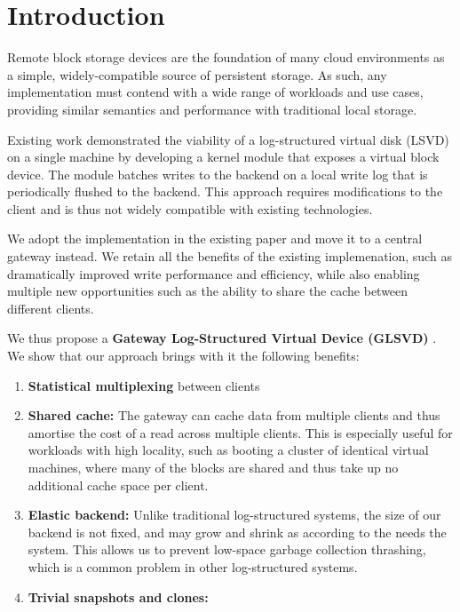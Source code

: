 \section{Introduction}

Remote block storage devices are the foundation of many cloud environments as
a simple, widely-compatible source of persistent storage. As such, any
implementation must contend with a wide range of workloads and use cases,
providing similar semantics and performance with traditional local storage.

Existing work \cite{lsvd} demonstrated the viability of a log-structured virtual
disk (LSVD) on a single machine by developing a kernel module that exposes a
virtual block device. The module batches writes to the backend on a local write
log that is periodically flushed to the backend.  This approach requires
modifications to the client and is thus not widely compatible with existing
technologies.

We adopt the implementation in the existing paper and move it to a central
gateway instead. We retain all the benefits of the existing implemenation, such
as dramatically improved write performance and efficiency, while also enabling
multiple new opportunities such as the ability to share the cache between
different clients.

We thus propose a \textbf{Gateway Log-Structured Virtual Device (GLSVD)}
. We show that our approach brings with it
the following benefits:


\begin{enumerate}

  \item \textbf{Statistical multiplexing} between clients

  \item \textbf{Shared cache:} The gateway can cache data from multiple clients
        and thus amortise the cost of a read across multiple clients. This is
        especially useful for workloads with high locality, such as booting a cluster
        of identical virtual machines, where many of the blocks are shared and thus
        take up no additional cache space per client.

  \item \textbf{Elastic backend:} Unlike traditional log-structured systems, the
        size of our backend is not fixed, and may grow and shrink as according to the
        needs the system. This allows us to prevent low-space garbage collection
        thrashing, which is a common problem in other log-structured systems.

  \item \textbf{Trivial snapshots and clones:}


\end{enumerate}

